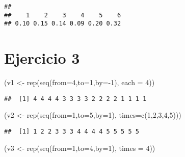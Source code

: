 \documentclass[
]{article}
\newenvironment{Shaded}{\begin{snugshade}}{\end{snugshade}}
\newcommand{\AttributeTok}[1]{\textcolor[rgb]{0.77,0.63,0.00}{#1}}
\newcommand{\DecValTok}[1]{\textcolor[rgb]{0.00,0.00,0.81}{#1}}
\newcommand{\FunctionTok}[1]{\textcolor[rgb]{0.00,0.00,0.00}{#1}}
\newcommand{\NormalTok}[1]{#1}
\newcommand{\OtherTok}[1]{\textcolor[rgb]{0.56,0.35,0.01}{#1}}
\newcommand{\SpecialCharTok}[1]{\textcolor[rgb]{0.00,0.00,0.00}{#1}}
\begin{document}
\begin{verbatim}
## 
##    1    2    3    4    5    6 
## 0.10 0.15 0.14 0.09 0.20 0.32
\end{verbatim}

\hypertarget{ejercicio-3}{%
\section{Ejercicio 3}\label{ejercicio-3}}

\begin{Shaded}
\begin{Highlighting}[]
\NormalTok{(v1 }\OtherTok{\textless{}{-}} \FunctionTok{rep}\NormalTok{(}\FunctionTok{seq}\NormalTok{(}\AttributeTok{from=}\DecValTok{4}\NormalTok{,}\AttributeTok{to=}\DecValTok{1}\NormalTok{,}\AttributeTok{by=}\SpecialCharTok{{-}}\DecValTok{1}\NormalTok{), }\AttributeTok{each =} \DecValTok{4}\NormalTok{))}
\end{Highlighting}
\end{Shaded}

\begin{verbatim}
##  [1] 4 4 4 4 3 3 3 3 2 2 2 2 1 1 1 1
\end{verbatim}

\begin{Shaded}
\begin{Highlighting}[]
\NormalTok{(v2 }\OtherTok{\textless{}{-}} \FunctionTok{rep}\NormalTok{(}\FunctionTok{seq}\NormalTok{(}\AttributeTok{from=}\DecValTok{1}\NormalTok{,}\AttributeTok{to=}\DecValTok{5}\NormalTok{,}\AttributeTok{by=}\DecValTok{1}\NormalTok{), }\AttributeTok{times=}\FunctionTok{c}\NormalTok{(}\DecValTok{1}\NormalTok{,}\DecValTok{2}\NormalTok{,}\DecValTok{3}\NormalTok{,}\DecValTok{4}\NormalTok{,}\DecValTok{5}\NormalTok{)))}
\end{Highlighting}
\end{Shaded}

\begin{verbatim}
##  [1] 1 2 2 3 3 3 4 4 4 4 5 5 5 5 5
\end{verbatim}

\begin{Shaded}
\begin{Highlighting}[]
\NormalTok{(v3 }\OtherTok{\textless{}{-}} \FunctionTok{rep}\NormalTok{(}\FunctionTok{seq}\NormalTok{(}\AttributeTok{from=}\DecValTok{1}\NormalTok{,}\AttributeTok{to=}\DecValTok{4}\NormalTok{,}\AttributeTok{by=}\DecValTok{1}\NormalTok{), }\AttributeTok{times =} \DecValTok{4}\NormalTok{))}
\end{Highlighting}
\end{Shaded}
\end{document}
